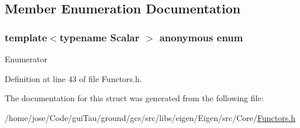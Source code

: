 \subsection{Member Enumeration Documentation}
\hypertarget{structei__functor__traits_3_01ei__scalar__sum__op_3_01_scalar_01_4_01_4_aac55e4954ebd746ec1f824b7300ea504}{\subsubsection[{anonymous enum}]{\setlength{\rightskip}{0pt plus 5cm}template$<$typename Scalar $>$ anonymous enum}}\label{structei__functor__traits_3_01ei__scalar__sum__op_3_01_scalar_01_4_01_4_aac55e4954ebd746ec1f824b7300ea504}
\begin{Desc}
\item[Enumerator]\par
\begin{description}
\item[{\em 
\hypertarget{structei__functor__traits_3_01ei__scalar__sum__op_3_01_scalar_01_4_01_4_aac55e4954ebd746ec1f824b7300ea504a5f60ca44023ffe1d4ac58f2e0b690855}{Cost}\label{structei__functor__traits_3_01ei__scalar__sum__op_3_01_scalar_01_4_01_4_aac55e4954ebd746ec1f824b7300ea504a5f60ca44023ffe1d4ac58f2e0b690855}
}]\end{description}
\end{Desc}


Definition at line 43 of file Functors.\-h.



The documentation for this struct was generated from the following file\-:\begin{DoxyCompactItemize}
\item 
/home/jose/\-Code/gui\-Tau/ground/gcs/src/libs/eigen/\-Eigen/src/\-Core/\hyperlink{_core_2_functors_8h}{Functors.\-h}\end{DoxyCompactItemize}
